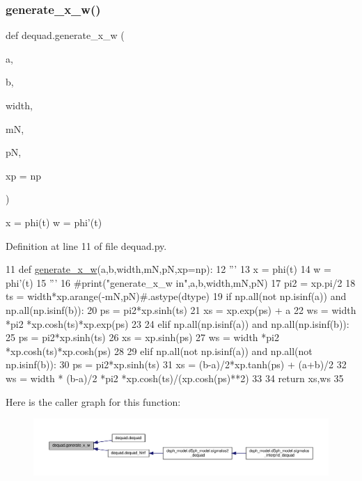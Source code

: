 \subsubsection{\texorpdfstring{generate\+\_\+x\+\_\+w()}{generate\_x\_w()}}
{\footnotesize\ttfamily def dequad.\+generate\+\_\+x\+\_\+w (\begin{DoxyParamCaption}\item[{}]{a,  }\item[{}]{b,  }\item[{}]{width,  }\item[{}]{mN,  }\item[{}]{pN,  }\item[{}]{xp = {\ttfamily np} }\end{DoxyParamCaption})}

\begin{DoxyVerb}x = phi(t)
w = phi'(t)
\end{DoxyVerb}
 

Definition at line 11 of file dequad.\+py.


\begin{DoxyCode}
11 \textcolor{keyword}{def }\hyperlink{namespacedequad_a0774348e796cb0945f2e0b0a7fa1c1e9}{generate\_x\_w}(a,b,width,mN,pN,xp=np):
12     \textcolor{stringliteral}{'''}
13 \textcolor{stringliteral}{    x = phi(t)}
14 \textcolor{stringliteral}{    w = phi'(t)}
15 \textcolor{stringliteral}{    '''}
16     \textcolor{comment}{#print("generate\_x\_w in",a,b,width,mN,pN)}
17     pi2 = xp.pi/2
18     ts = width*xp.arange(-mN,pN)\textcolor{comment}{#.astype(dtype)}
19     \textcolor{keywordflow}{if} np.all(\textcolor{keywordflow}{not} np.isinf(a)) \textcolor{keywordflow}{and} np.all(np.isinf(b)):
20         ps = pi2*xp.sinh(ts)
21         xs = xp.exp(ps) + a
22         ws = width *pi2 *xp.cosh(ts)*xp.exp(ps)    
23         
24     \textcolor{keywordflow}{elif} np.all(np.isinf(a)) \textcolor{keywordflow}{and} np.all(np.isinf(b)):
25         ps = pi2*xp.sinh(ts)
26         xs = xp.sinh(ps)
27         ws = width *pi2 *xp.cosh(ts)*xp.cosh(ps)  
28         
29     \textcolor{keywordflow}{elif} np.all(\textcolor{keywordflow}{not} np.isinf(a)) \textcolor{keywordflow}{and} np.all(\textcolor{keywordflow}{not} np.isinf(b)):
30         ps = pi2*xp.sinh(ts)
31         xs = (b-a)/2*xp.tanh(ps) + (a+b)/2
32         ws = width * (b-a)/2 *pi2 *xp.cosh(ts)/(xp.cosh(ps)**2)
33         
34     \textcolor{keywordflow}{return} xs,ws
35 
\end{DoxyCode}
Here is the caller graph for this function\+:\nopagebreak
\begin{figure}[H]
\begin{center}
\leavevmode
\includegraphics[width=350pt]{da/dfc/namespacedequad_a0774348e796cb0945f2e0b0a7fa1c1e9_icgraph}
\end{center}
\end{figure}


